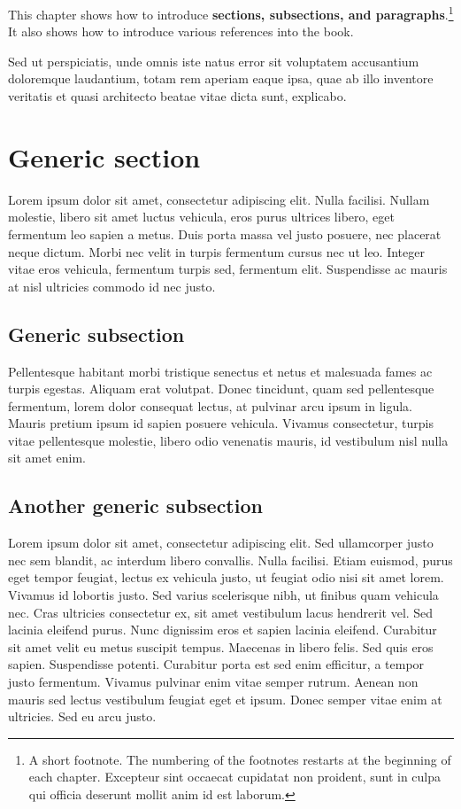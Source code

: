 This chapter shows how to introduce \textbf{sections, subsections, and paragraphs}.\footnote{A short footnote. The numbering of the footnotes restarts at the beginning of each chapter. Excepteur sint occaecat cupidatat non proident, sunt in culpa qui officia deserunt mollit anim id est laborum.} It also shows how to introduce various references into the book.

Sed ut perspiciatis, unde omnis iste natus error sit voluptatem accusantium doloremque laudantium, totam rem aperiam eaque ipsa, quae ab illo inventore veritatis et quasi architecto beatae vitae dicta sunt, explicabo. 

\section{Generic section}\label{s:section}

Lorem ipsum dolor sit amet, consectetur adipiscing elit. Nulla facilisi. Nullam molestie, libero sit amet luctus vehicula, eros purus ultrices libero, eget fermentum leo sapien a metus. Duis porta massa vel justo posuere, nec placerat neque dictum. Morbi nec velit in turpis fermentum cursus nec ut leo. Integer vitae eros vehicula, fermentum turpis sed, fermentum elit. Suspendisse ac mauris at nisl ultricies commodo id nec justo. 

\subsection{Generic subsection}

Pellentesque habitant morbi tristique senectus et netus et malesuada fames ac turpis egestas. Aliquam erat volutpat. Donec tincidunt, quam sed pellentesque fermentum, lorem dolor consequat lectus, at pulvinar arcu ipsum in ligula. Mauris pretium ipsum id sapien posuere vehicula. Vivamus consectetur, turpis vitae pellentesque molestie, libero odio venenatis mauris, id vestibulum nisl nulla sit amet enim.

\subsection{Another generic subsection}

Lorem ipsum dolor sit amet, consectetur adipiscing elit. Sed ullamcorper justo nec sem blandit, ac interdum libero convallis. Nulla facilisi. Etiam euismod, purus eget tempor feugiat, lectus ex vehicula justo, ut feugiat odio nisi sit amet lorem. Vivamus id lobortis justo. Sed varius scelerisque nibh, ut finibus quam vehicula nec. Cras ultricies consectetur ex, sit amet vestibulum lacus hendrerit vel. Sed lacinia eleifend purus. Nunc dignissim eros et sapien lacinia eleifend. Curabitur sit amet velit eu metus suscipit tempus. Maecenas in libero felis. Sed quis eros sapien. Suspendisse potenti. Curabitur porta est sed enim efficitur, a tempor justo fermentum. Vivamus pulvinar enim vitae semper rutrum. Aenean non mauris sed lectus vestibulum feugiat eget et ipsum. Donec semper vitae enim at ultricies. Sed eu arcu justo.

